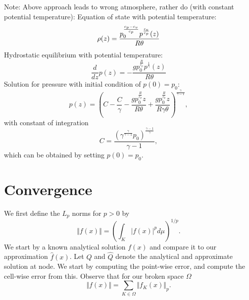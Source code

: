 Note: Above approach leads to wrong atmosphere, rather do (with constant potential temperature):
Equation of state with potential temperature:
\begin{equation}
  \label{eq:eos}
\rho(z) = \frac{p_{0}^{\frac{c_{p} - c_{v}}{c_{p}}} p^{\frac{c_{v}}{c_{p}}}{\left (z \right )}}{R \theta}
\end{equation}
Hydrostatic equilibrium with potential temperature:
\begin{equation}
  \label{eq:hydrostatic-balance-potT}
  \frac{d}{d z} p{\left (z \right )} = - \frac{g p_{0}^{\frac{R}{c_{p}}} p^{\frac{1}{\gamma}}{\left (z \right )}}{R \theta}
\end{equation}
Solution for pressure with initial condition of $p(0) = p_0$:
\begin{equation}
p(z) =  \left(C - \frac{C}{\gamma} - \frac{g p_{0}^{\frac{R}{c_{p}}} z}{R \theta} + \frac{g p_{0}^{\frac{R}{c_{p}}} z}{R \gamma \theta}\right)^{\frac{\gamma}{\gamma - 1}},
\end{equation}
with constant of integration
\begin{equation}
  \label{eq:hydrostatic-balance-constant}
 C = \frac{\left(\gamma^{\frac{\gamma}{\gamma - 1}} p_{0}\right)^{\frac{\gamma - 1}{\gamma}}}{\gamma - 1},
\end{equation}
which can be obtained by setting $p(0) = p_0$.

\section{Convergence}
We first define the $L_p$ norms for $p > 0$ by
\begin{equation}
  \label{eq:Lp-nrom}
  \Vert f(x) \Vert = \left( \int_K \vert f(x) \vert^p d\mu  \right)^{1/p}.
\end{equation}
We start by a known analytical solution $f(x)$ and compare it to our approximation $\hat{f}(x)$.
Let $Q$ and $\hat{Q}$ denote the analytical and approximate solution at node.
We start by computing the point-wise error, and compute the cell-wise error from this.
Observe that for our broken space $\Omega$
\begin{equation}
  \label{eq:lp-norm-broken}
 \Vert f(x) \Vert = \sum_{K \in \Omega} \Vert f_K(x) \Vert_p.
\end{equation}

